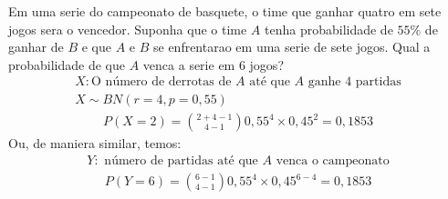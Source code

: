 \begin{description}
      \begin{example}
        Em uma serie do campeonato de basquete, o time que ganhar quatro em sete jogos sera
        o vencedor. Suponha que o time $A$ tenha probabilidade de $55\%$ de ganhar de $B$ e que $A$ e $B$ 
        se enfrentarao em uma serie de sete jogos. Qual a probabilidade de que $A$ venca a serie em 6 jogos?
        \begin{align*} 
          X:\text{O número de derrotas de $A$ até que $A$ ganhe 4 partidas}\\
          X \mathtt{\sim}BN (r=4, p=0,55)
        \end{align*}
        \begin{align*}
          P(X=2)=\binom{2+4-1}{4-1} 0,55^{4}\times 0,45^{2}=0,1853
        \end{align*}
        Ou, de maniera similar, temos:
        \begin{align*}
          Y: \text{ número de partidas até que $A$ venca o campeonato}
        \end{align*}
        \begin{align*}
          P(Y=6)= \binom{6-1}{4-1} 0,55^{4} \times 0,45^{6-4} = 0,1853
        \end{align*}
    \end{example} \end{description}
